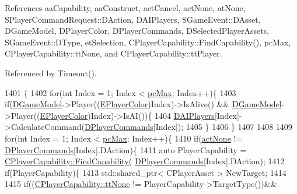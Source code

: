 References aa\+Capability, aa\+Construct, act\+Cancel, act\+None, at\+None, S\+Player\+Command\+Request\+::\+D\+Action, D\+A\+I\+Players, S\+Game\+Event\+::\+D\+Asset, D\+Game\+Model, D\+Player\+Color, D\+Player\+Commands, D\+Selected\+Player\+Assets, S\+Game\+Event\+::\+D\+Type, et\+Selection, C\+Player\+Capability\+::\+Find\+Capability(), pc\+Max, C\+Player\+Capability\+::tt\+None, and C\+Player\+Capability\+::tt\+Player.



Referenced by Timeout().


\begin{DoxyCode}
1401                                         \{
1402     \textcolor{keywordflow}{for}(\textcolor{keywordtype}{int} Index = 1; Index < \hyperlink{GameDataTypes_8h_aafb0ca75933357ff28a6d7efbdd7602fa594a5c8dd3987f24e8a0f23f1a72cd34}{pcMax}; Index++)\{
1403         \textcolor{keywordflow}{if}(\hyperlink{classCApplicationData_a32b50c7c1cbac3cfd67c7f775b1d6fee}{DGameModel}->Player((\hyperlink{GameDataTypes_8h_aafb0ca75933357ff28a6d7efbdd7602f}{EPlayerColor})Index)->IsAlive() && 
      \hyperlink{classCApplicationData_a32b50c7c1cbac3cfd67c7f775b1d6fee}{DGameModel}->Player((\hyperlink{GameDataTypes_8h_aafb0ca75933357ff28a6d7efbdd7602f}{EPlayerColor})Index)->IsAI())\{
1404             \hyperlink{classCApplicationData_a839f21d18d88deb29fe1196a8efc6096}{DAIPlayers}[Index]->CalculateCommand(\hyperlink{classCApplicationData_a2df1addeb7622233f72dc056bbcf31a1}{DPlayerCommands}[Index]); 
1405         \}
1406     \}
1407 
1408     
1409     \textcolor{keywordflow}{for}(\textcolor{keywordtype}{int} Index = 1; Index < \hyperlink{GameDataTypes_8h_aafb0ca75933357ff28a6d7efbdd7602fa594a5c8dd3987f24e8a0f23f1a72cd34}{pcMax}; Index++)\{
1410         \textcolor{keywordflow}{if}(\hyperlink{GameDataTypes_8h_a35b98ce26aca678b03c6f9f76e4778ceaa8df154ad276f6f62054e9b5b0696f92}{actNone} != \hyperlink{classCApplicationData_a2df1addeb7622233f72dc056bbcf31a1}{DPlayerCommands}[Index].DAction)\{
1411             \textcolor{keyword}{auto} PlayerCapability = \hyperlink{classCPlayerCapability_a881ba4b87385d7cfe5cb6ced2d26f226}{CPlayerCapability::FindCapability}(
      \hyperlink{classCApplicationData_a2df1addeb7622233f72dc056bbcf31a1}{DPlayerCommands}[Index].DAction); 
1412             \textcolor{keywordflow}{if}(PlayerCapability)\{
1413                 std::shared\_ptr< CPlayerAsset > NewTarget;
1414 
1415                 \textcolor{keywordflow}{if}((\hyperlink{classCPlayerCapability_a9d3450ed1532fd536bd6cbb1e2eef02fac78f0e806a6b0ead030d63c27c9ce929}{CPlayerCapability::ttNone} != PlayerCapability->TargetType())&&

\end{DoxyCode}
